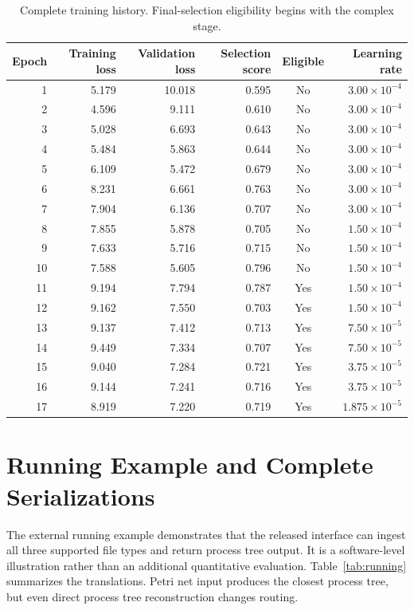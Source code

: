 \documentclass[applsci,supfile,submit,pdftex,moreauthors]{Definitions/mdpi}
\begin{document}
\begin{table}[H]
\centering
\caption{Complete training history. Final-selection eligibility begins with the complex stage.}
\label{tab:history}
\begin{tabular}{@{}rrrrcr@{}}
\toprule
Epoch & Training loss & Validation loss & Selection score & Eligible & Learning rate \\
\midrule
1  & 5.179 & 10.018 & 0.595 & No  & $3.00\times10^{-4}$ \\
2  & 4.596 & 9.111  & 0.610 & No  & $3.00\times10^{-4}$ \\
3  & 5.028 & 6.693  & 0.643 & No  & $3.00\times10^{-4}$ \\
4  & 5.484 & 5.863  & 0.644 & No  & $3.00\times10^{-4}$ \\
5  & 6.109 & 5.472  & 0.679 & No  & $3.00\times10^{-4}$ \\
6  & 8.231 & 6.661  & 0.763 & No  & $3.00\times10^{-4}$ \\
7  & 7.904 & 6.136  & 0.707 & No  & $3.00\times10^{-4}$ \\
8  & 7.855 & 5.878  & 0.705 & No  & $1.50\times10^{-4}$ \\
9  & 7.633 & 5.716  & 0.715 & No  & $1.50\times10^{-4}$ \\
10 & 7.588 & 5.605  & 0.796 & No  & $1.50\times10^{-4}$ \\
11 & 9.194 & 7.794  & 0.787 & Yes & $1.50\times10^{-4}$ \\
12 & 9.162 & 7.550  & 0.703 & Yes & $1.50\times10^{-4}$ \\
13 & 9.137 & 7.412  & 0.713 & Yes & $7.50\times10^{-5}$ \\
14 & 9.449 & 7.334  & 0.707 & Yes & $7.50\times10^{-5}$ \\
15 & 9.040 & 7.284  & 0.721 & Yes & $3.75\times10^{-5}$ \\
16 & 9.144 & 7.241  & 0.716 & Yes & $3.75\times10^{-5}$ \\
17 & 8.919 & 7.220  & 0.719 & Yes & $1.875\times10^{-5}$ \\
\bottomrule
\end{tabular}
\end{table}

\FloatBarrier

\section{Running Example and Complete Serializations}\label{sec:supp-running}

The external running example demonstrates that the released interface can ingest all three supported file types and return process tree output. It is a software-level illustration rather than an additional quantitative evaluation. Table~\ref{tab:running} summarizes the translations. Petri net input produces the closest process tree, but even direct process tree reconstruction changes routing.
\end{document}
